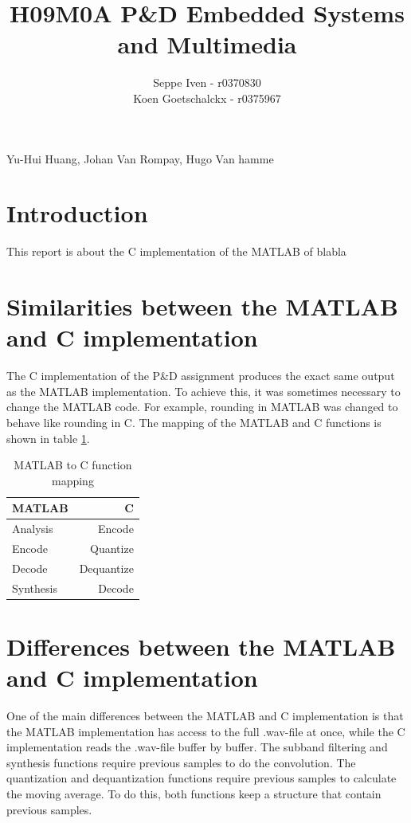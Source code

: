 \documentclass[a4paper]{article}
\title{H09M0A P\&D Embedded Systems and Multimedia}
\author{Seppe Iven - r0370830 \\ Koen Goetschalckx - r0375967}
\begin{document}
 
\maketitle
\begin{center} Yu-Hui Huang, Johan Van Rompay, Hugo Van hamme
\end{center}

\section{Introduction}
This report is about the C implementation of the MATLAB of blabla

\section{Similarities between the MATLAB and C implementation}
The C implementation of the P\&D assignment produces the exact same output as the MATLAB implementation. To achieve this, it was sometimes necessary to change the MATLAB code. For example, rounding in MATLAB was changed to behave like rounding in C. The mapping of the MATLAB and C functions is shown in table \ref{tbl:mapping}.
\begin{center}
\begin{table}
\begin{tabular}{l|r}
MATLAB & C \\
\hline
Analysis & Encode \\
Encode & Quantize \\
Decode & Dequantize \\
Synthesis & Decode \\
\end{tabular}
\caption{MATLAB to C function mapping}
\label{tbl:mapping}
\end{table}
\end{center}

\section{Differences between the MATLAB and C implementation}
One of the main differences between the MATLAB and C implementation is that the MATLAB implementation has access to the full .wav-file at once, while the C implementation reads the .wav-file buffer by buffer. The subband filtering and synthesis functions require previous samples to do the convolution. The quantization and dequantization functions require previous samples to calculate the moving average. To do this, both functions keep a structure that contain previous samples.
\end{document}
